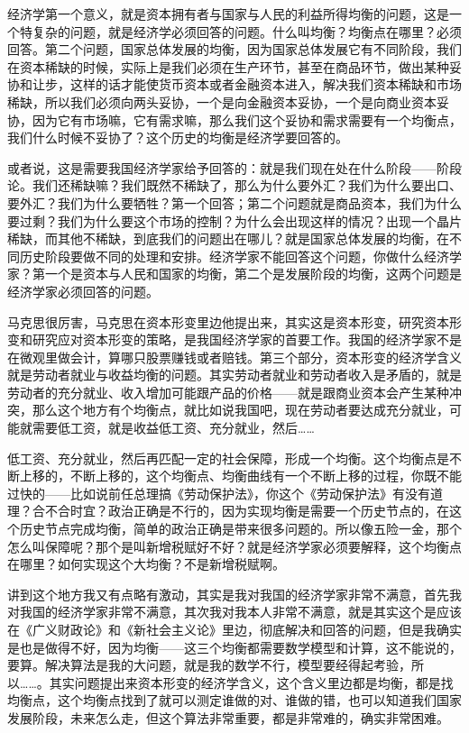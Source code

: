 \documentclass[UTF8, 12pt, a4paper]{ctexrep}
\begin{document}
经济学第一个意义，就是资本拥有者与国家与人民的利益所得均衡的问题，这是一个特复杂的问题，就是经济学必须回答的问题。什么叫均衡？均衡点在哪里？必须回答。第二个问题，国家总体发展的均衡，因为国家总体发展它有不同阶段，我们在资本稀缺的时候，实际上是我们必须在生产环节，甚至在商品环节，做出某种妥协和让步，这样的话才能使货币资本或者金融资本进入，解决我们资本稀缺和市场稀缺，所以我们必须向两头妥协，一个是向金融资本妥协，一个是向商业资本妥协，因为它有市场嘛，它有需求嘛，那么我们这个妥协和需求需要有一个均衡点，我们什么时候不妥协了？这个历史的均衡是经济学要回答的。

或者说，这是需要我国经济学家给予回答的：就是我们现在处在什么阶段——阶段论。我们还稀缺嘛？我们既然不稀缺了，那么为什么要外汇？我们为什么要出口、要外汇？我们为什么要牺牲？第一个回答；第二个问题就是商品资本，我们为什么要过剩？我们为什么要这个市场的控制？为什么会出现这样的情况？出现一个晶片稀缺，而其他不稀缺，到底我们的问题出在哪儿？就是国家总体发展的均衡，在不同历史阶段要做不同的处理和安排。经济学家不能回答这个问题，你做什么经济学家？第一个是资本与人民和国家的均衡，第二个是发展阶段的均衡，这两个问题是经济学家必须回答的问题。

马克思很厉害，马克思在资本形变里边他提出来，其实这是资本形变，研究资本形变和研究应对资本形变的策略，是我国经济学家的首要工作。我国的经济学家不是在微观里做会计，算哪只股票赚钱或者赔钱。第三个部分，资本形变的经济学含义就是劳动者就业与收益均衡的问题。其实劳动者就业和劳动者收入是矛盾的，就是劳动者的充分就业、收入增加可能跟产品的价格——就是跟商业资本会产生某种冲突，那么这个地方有个均衡点，就比如说我国吧，现在劳动者要达成充分就业，可能就需要低工资，就是收益低工资、充分就业，然后……

低工资、充分就业，然后再匹配一定的社会保障，形成一个均衡。这个均衡点是不断上移的，不断上移的，这个均衡点、均衡曲线有一个不断上移的过程，你既不能过快的——比如说前任总理搞《劳动保护法》，你这个《劳动保护法》有没有道理？合不合时宜？政治正确是不行的，因为实现均衡是需要一个历史节点的，在这个历史节点完成均衡，简单的政治正确是带来很多问题的。所以像五险一金，那个怎么叫保障呢？那个是叫新增税赋好不好？就是经济学家必须要解释，这个均衡点在哪里？如何实现这个大均衡？不是新增税赋啊。

讲到这个地方我又有点略有激动，其实是我对我国的经济学家非常不满意，首先我对我国的经济学家非常不满意，其次我对我本人非常不满意，就是其实这个是应该在《广义财政论》和《新社会主义论》里边，彻底解决和回答的问题，但是我确实是也是做得不好，因为均衡——这三个均衡都需要数学模型和计算，这不能说的，要算。解决算法是我的大问题，就是我的数学不行，模型要经得起考验，所以……。其实问题提出来资本形变的经济学含义，这个含义里边都是均衡，都是找均衡点，这个均衡点找到了就可以测定谁做的对、谁做的错，也可以知道我们国家发展阶段，未来怎么走，但这个算法非常重要，都是非常难的，确实非常困难。
\end{document}
